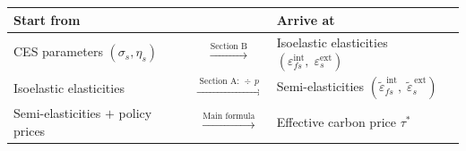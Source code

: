 \documentclass[11pt,a4paper]{article}
\begin{document}
\vspace{0.3em}

\begin{center}
\renewcommand{\arraystretch}{1.3}
\begin{tabular}{lcl}
\toprule
\textbf{Start from} & & \textbf{Arrive at} \\
\midrule
CES parameters $(\sigma_s, \eta_s)$ & $\xrightarrow{\text{Section B}}$ & Isoelastic elasticities $(\varepsilon^{\mathrm{int}}_{fs},\; \varepsilon^{\mathrm{ext}}_s)$ \\[4pt]
Isoelastic elasticities & $\xrightarrow{\;\text{Section A: } \div\, p\;}$ & Semi-elasticities $(\tilde{\varepsilon}^{\,\mathrm{int}}_{fs},\; \tilde{\varepsilon}^{\,\mathrm{ext}}_s)$ \\[4pt]
Semi-elasticities $+$ policy prices & $\xrightarrow{\text{Main formula}}$ & Effective carbon price $\tau^*$ \\
\bottomrule
\end{tabular}
\end{center}
\end{document}
